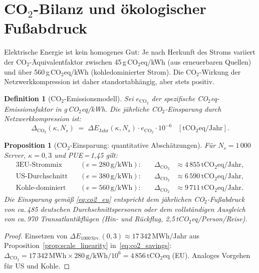 \documentclass[12pt, a4paper, openany]{report}
\newtheorem{proposition}[theorem]{Proposition}
\newtheorem{definition}[theorem]{Definition}
\begin{document}
\section{CO\texorpdfstring{$_2$}{2}-Bilanz und ökologischer Fußabdruck}
\label{sec:co2}

Elektrische Energie ist kein homogenes Gut: Je nach Herkunft des
Stroms variiert der CO{$_2$}-Äquivalentfaktor zwischen 45\,g\,CO$_2$eq/kWh
(aus erneuerbaren Quellen) und über 560\,g\,CO$_2$eq/kWh (kohledominierter
Strom).  Die CO$_2$-Wirkung der Netzwerkkompression ist daher
standortabhängig, aber stets positiv.

\begin{definition}[CO$_2$-Emissionsmodell]
\label{def:co2_model}
Sei $e_{\mathrm{CO_2}}$ der spezifische CO$_2$eq-Emissionsfaktor in
g\,CO$_2$eq/kWh.  Die jährliche CO$_2$-Einsparung durch
Netzwerkkompression ist:
\begin{equation}
  \label{eq:co2_savings}
  \Delta_{\mathrm{CO_2}}(\kappa, N_s)
  \;=\;
  \Delta E_{\mathrm{Jahr}}(\kappa, N_s) \cdot e_{\mathrm{CO_2}} \cdot 10^{-6}
  \;\;\;[\mathrm{tCO_2eq/Jahr}].
\end{equation}
\end{definition}

\begin{proposition}[CO$_2$-Einsparung: quantitative Abschätzungen]
\label{prop:co2_estimates}
Für $N_s = 1\,000$ Server, $\kappa = 0{,}3$ und PUE\,=\,1{,}45 gilt:
\begin{alignat}{3}
  \text{EU-Strommix}   &\quad(e = 280\,\mathrm{g/kWh}):\quad&
    \Delta_{\mathrm{CO_2}} &\approx 4\,855\,\mathrm{tCO_2eq/Jahr}, \label{eq:co2_eu} \\
  \text{US-Durchschnitt}&\quad(e = 380\,\mathrm{g/kWh}):\quad&
    \Delta_{\mathrm{CO_2}} &\approx 6\,590\,\mathrm{tCO_2eq/Jahr}, \label{eq:co2_us} \\
  \text{Kohle-dominiert}&\quad(e = 560\,\mathrm{g/kWh}):\quad&
    \Delta_{\mathrm{CO_2}} &\approx 9\,711\,\mathrm{tCO_2eq/Jahr}. \label{eq:co2_cn}
\end{alignat}
Die Einsparung gemäß \eqref{eq:co2_eu} entspricht dem jährlichen
CO$_2$-Fußabdruck von ca.\,485 deutschen Durchschnittspersonen oder
dem vollständigen Ausgleich von ca.\,970 Transatlantikflügen
(Hin- und Rückflug, 2{,}5\,tCO$_2$eq/Person/Reise).
\end{proposition}

\begin{proof}
Einsetzen von $\Delta E_{1000\,\mathrm{Srv.}}(0{,}3) \approx 17\,342\,\mathrm{MWh/Jahr}$
aus Proposition~\ref{prop:scale_linearity} in~\eqref{eq:co2_savings}:
$\Delta_{\mathrm{CO_2}} = 17\,342\,\mathrm{MWh} \times 280\,\mathrm{g/kWh} / 10^6 = 4\,856\,\mathrm{tCO_2eq}$
(EU).  Analoges Vorgehen für US und Kohle.
\end{proof}
\end{document}
